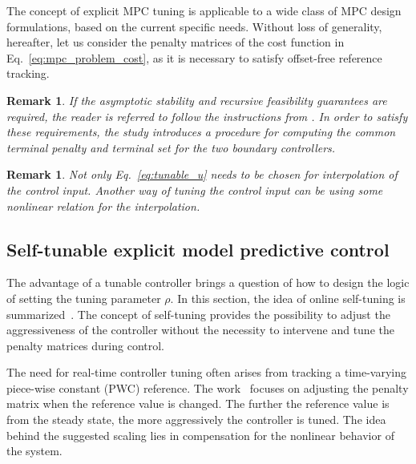 \documentclass[preprint,12pt]{elsarticle}
\newtheorem{remark}[theorem]{Remark}
\begin{document}
	The concept of explicit MPC tuning is applicable to a wide class of MPC design formulations, based on the current specific needs. Without loss of generality, hereafter, let us consider the penalty matrices of the cost function in Eq.~\eqref{eq:mpc_problem_cost}, as it is necessary to satisfy offset-free reference tracking.
	
	\begin{remark}
		If the asymptotic stability and recursive feasibility guarantees are required, the reader is referred to follow the instructions from \cite{Oravec_tunable}. In order to satisfy these requirements, the study introduces a procedure for computing the common terminal penalty and terminal set for the two boundary controllers. 
	\end{remark}
	
	\begin{remark}
		Not only Eq.~\eqref{eq:tunable_u} needs to be chosen for interpolation of the control input. Another way of tuning the control input can be using some nonlinear relation for the interpolation. 
	\end{remark}
	
	
	
	\subsection{Self-tunable explicit model predictive control}
	\label{sec:self_tunable}	
	The advantage of a tunable controller brings a question of how to design the logic of setting the tuning parameter $\rho$. In this section, the idea of online self-tuning is summarized~\cite{self_tunable}. The concept of self-tuning provides the possibility to adjust the aggressiveness of the controller without the necessity to intervene and tune the penalty matrices during control. 
	
	The need for real-time controller tuning often arises from tracking a time-varying piece-wise constant (PWC) reference. The work~\cite{self_tunable} focuses on adjusting the penalty matrix when the reference value is changed. The further the reference value is from the steady state, the more aggressively the controller is tuned. The idea behind the suggested scaling lies in compensation for the nonlinear behavior of the system.  
	
\end{document}
